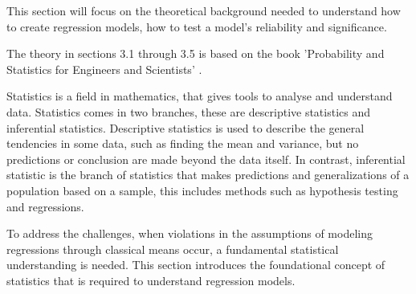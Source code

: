 This section will focus on the theoretical background needed to understand how to create regression models, how to test a model's reliability and significance.

\noindent The theory in sections 3.1 through 3.5 is based on the book 'Probability and Statistics for Engineers and Scientists' \cite{ProbAndStat}. \newline

\noindent Statistics is a field in mathematics, that gives tools to analyse and understand data. Statistics comes in two branches, these are descriptive statistics and inferential statistics. Descriptive statistics is used to describe the general tendencies in some data, such as finding the mean and variance, but no predictions or conclusion are made beyond the data itself. In contrast, inferential statistic is the branch of statistics that makes predictions and generalizations of a population based on a sample, this includes methods such as hypothesis testing and regressions. 

\noindent To address the challenges, when violations in the assumptions of modeling regressions through classical means occur, a fundamental statistical understanding is needed. This section introduces the foundational concept of statistics that is required to understand regression models.






\newpage

